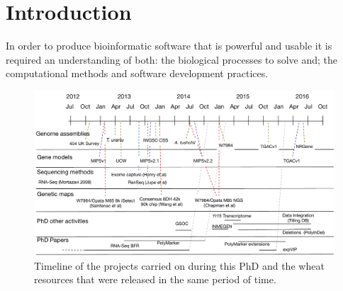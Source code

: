 
\chapter{Introduction}


In order to produce bioinformatic software that is powerful and usable it is required an understanding of both: the biological processes to solve and; the computational methods and software development practices.

\begin{landscape}
 \begin{figure}
  \centering
  \includegraphics[height=0.9\textheight]{Introduction/RicardoPhdTimelineV1.pdf}
  \caption[PhD timeline.]{Timeline of the projects carried on during this PhD and the wheat resources that were released in the same period of time. }
  \label{fig:intro:timeline}
 \end{figure}
\end{landscape}


